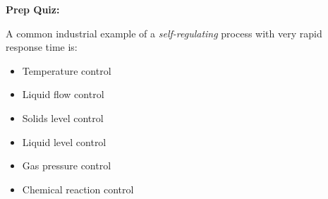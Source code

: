 \vfil \eject

\noindent
{\bf Prep Quiz:}

A common industrial example of a {\it self-regulating} process with very rapid response time is:

\begin{itemize}
\item{} Temperature control
\vskip 5pt 
\item{} Liquid flow control
\vskip 5pt 
\item{} Solids level control
\vskip 5pt 
\item{} Liquid level control
\vskip 5pt 
\item{} Gas pressure control
\vskip 5pt 
\item{} Chemical reaction control
\end{itemize}




